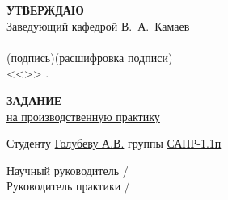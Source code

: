 \begin{titlepage}
    \begin{flushright}
        \textbf{\MakeUppercase{Утверждаю}}\hspace{4.5cm}~\\
        Заведующий кафедрой В.~А.~Камаев \\
        \underline{\hspace{3.2cm}} \underline{\hspace{4.5cm}}\\
        \vspace{-0.2cm}\footnotesize(подпись)\hspace{1.4cm}(расшифровка подписи)\hspace{0.4cm}~\normalsize\\
        <<\underline{\hspace{2cm}}>>\underline{\hspace{4cm}} \the{}.
    \end{flushright}
    \vspace{1cm}
    \begin{center}
        \textbf{\MakeUppercase{Задание}}\\
        \underline{на производственную практику}
    \end{center}
    \vspace{1cm}
    Студенту \underline{Голубеву А.В.} группы \underline{САПР-1.1п}\\
    \underline{\hspace{\textwidth}}
    \underline{\hspace{\textwidth}}
    \underline{\hspace{\textwidth}}
    \underline{\hspace{\textwidth}}
    \underline{\hspace{\textwidth}}
    \underline{\hspace{\textwidth}}
    \underline{\hspace{\textwidth}}
    \underline{\hspace{\textwidth}}
    \underline{\hspace{\textwidth}}
    \underline{\hspace{\textwidth}}
    \vspace{\fill}
    \begin{flushright}
        Научный руководитель \underline{\hspace{5cm}} / \underline{\hspace{3cm}}\\
        Руководитель практики \underline{\hspace{5cm}} / \underline{\hspace{3cm}}
    \end{flushright}
\end{titlepage}